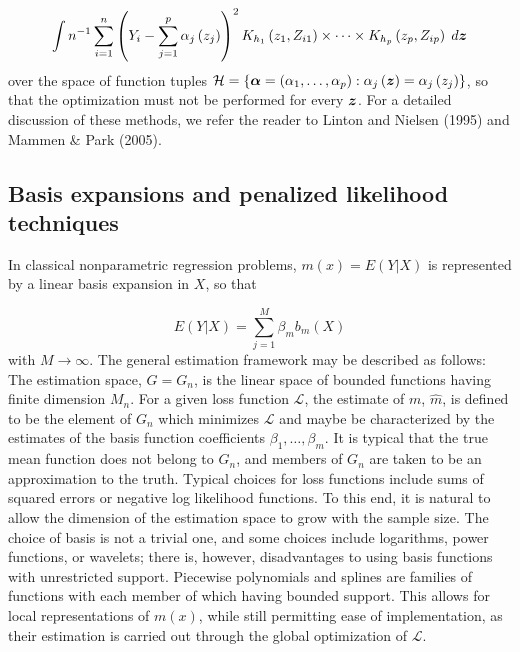 \documentclass[12pt]{article}
\newcommand{\bfalpha}{\mbox{\boldmath $\alpha$}}
\newcommand{\bfz}{\mbox{\boldmath $z$}}
\begin{document}
\[
\int n^{-1} \sum_{i=1}^n \left( Y_i - \sum_{j=1}^p \alpha_j\left(z_j\right) \right)^2 K_{h_1}\left(z_1,Z_{i1}\right) \times \dots \times K_{h_p}\left(z_p,Z_{ip}\right) \;d\bfz
\]
\noindent
over the space of function tuples $\mathcal{H} = \left\{ \bfalpha = \left(\alpha_1,\dots, \alpha_p\right):\alpha_j\left(\bfz\right) = \alpha_j\left(z_j\right) \right\}$, so that the optimization must not be performed for every $\bfz$. For a detailed discussion of these methods, we refer the reader to Linton and Nielsen (1995) and Mammen \& Park (2005). 





\subsection{Basis expansions and penalized likelihood techniques} \label{VC_spline_models}

In classical nonparametric regression problems, $m\left(x\right) = E\left(Y\vert X\right)$ is represented by a linear basis expansion in $X$, so that

\[
E\left(Y \vert X\right) = \sum_{j=1}^M \beta_m b_m\left(X\right)
\]
\noindent
with $M \rightarrow \infty$. The general estimation framework may be described as follows: The estimation space, $G = G_n$, is the linear space of bounded functions having finite dimension $M_n$. For a given loss function $\mathcal{L}$, the estimate of $m$, $\hat{m}$, is defined to be the element of $G_n$ which minimizes $\mathcal{L}$ and maybe be characterized by the estimates of the basis function coefficients $\beta_1,\dots, \beta_m$. It is typical that the true mean function does not belong to $G_n$, and members of $G_n$ are taken to be an approximation to the truth. Typical choices for loss functions include sums of squared errors or negative log likelihood functions. To this end, it is natural to allow the dimension of the estimation space to grow with the sample size. The choice of basis is not a trivial one, and some choices include logarithms, power functions, or wavelets; there is, however, disadvantages to using basis functions with unrestricted support. Piecewise polynomials and splines are families of functions with each member of which having bounded support. This allows for local representations of $m\left(x\right)$, while still permitting ease of implementation, as their estimation is carried out through the global optimization of $\mathcal{L}$. 
\end{document}
